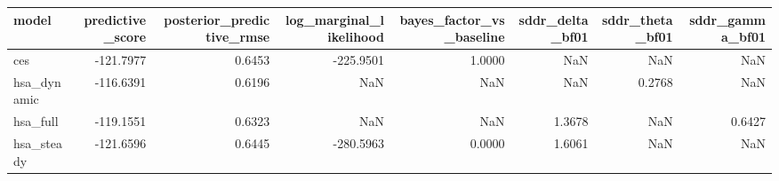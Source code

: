 \begin{tabular}{lrrrrrrr}
\toprule
model & predictive\_score & posterior\_predictive\_rmse & log\_marginal\_likelihood & bayes\_factor\_vs\_baseline & sddr\_delta\_bf01 & sddr\_theta\_bf01 & sddr\_gamma\_bf01 \\
\midrule
ces & -121.7977 & 0.6453 & -225.9501 & 1.0000 & NaN & NaN & NaN \\
hsa\_dynamic & -116.6391 & 0.6196 & NaN & NaN & NaN & 0.2768 & NaN \\
hsa\_full & -119.1551 & 0.6323 & NaN & NaN & 1.3678 & NaN & 0.6427 \\
hsa\_steady & -121.6596 & 0.6445 & -280.5963 & 0.0000 & 1.6061 & NaN & NaN \\
\bottomrule
\end{tabular}
